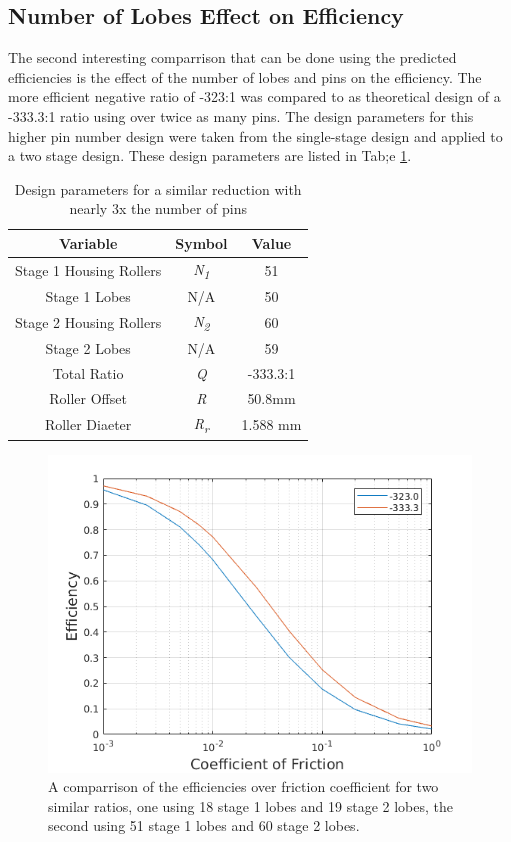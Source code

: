 \subsection{Number of Lobes Effect on Efficiency}\label{ch:dual:discussion:num_lobes}

The second interesting comparrison that can be done using the predicted efficiencies is the effect of the number of lobes and pins on the efficiency. The more efficient negative ratio of -323:1 was compared to as theoretical design of a -333.3:1 ratio using over twice as many pins. The design parameters for this higher pin number design were taken from the single-stage design and applied to a two stage design. These design parameters are listed in Tab;e \ref{table:two_stage_high_pins}. 

\begin{table}[h]
  \vskip0.2cm
  \caption{Design parameters for a similar reduction with nearly 3x the number of pins}
  \label{table:two_stage_high_pins}
  \begin{center}
    \vskip-0.2cm
	\begin{tabular}{|c|c|c|}
		\hline
		Variable & Symbol & Value\\
		\hline
		Stage 1 Housing Rollers & \textit{N\textsubscript{1}} & 51\\
		\hline
		Stage 1 Lobes & N/A & 50\\
		\hline
		Stage 2 Housing Rollers & \textit{N\textsubscript{2}} & 60\\
		\hline
		Stage 2 Lobes & N/A & 59\\
		\hline
		Total Ratio & \textit{Q} & -333.3:1 \\
		\hline
		Roller Offset & \textit{R} & 50.8mm \\
		\hline
		Roller Diaeter & \textit{R\textsubscript{r}} & 1.588 mm\\
		\hline
	\end{tabular}
  \end{center}
\end{table}

\begin{figure}[h]
	\centering
	\includegraphics[width=0.75\linewidth]{fig/two_stage_more_pins}
   \caption{A comparrison of the efficiencies over friction coefficient for two similar ratios, one using 18 stage 1 lobes and 19 stage 2 lobes, the second using 51 stage 1 lobes and 60 stage 2 lobes.}
   \label{fig:two_stage_more_pins}
\end{figure}

